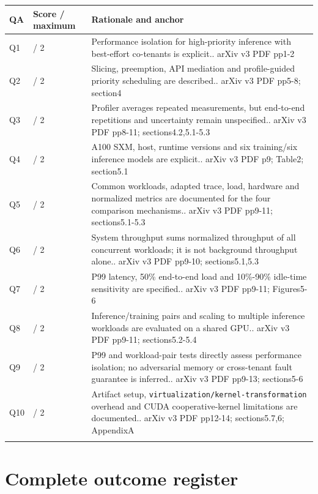\begin{longtable}{>{\raggedright\arraybackslash}p{}>{\raggedright\arraybackslash}p{}>{\raggedright\arraybackslash}p{}}
\toprule
\textbf{QA} & \textbf{Score / maximum} & \textbf{Rationale and anchor}\\\midrule\endhead
Q1 & 2 / 2 & Performance isolation for high-priority inference with best-effort co-tenants is explicit.. arXiv v3 PDF pp1-2\\\addlinespace
Q2 & 2 / 2 & Slicing, preemption, API mediation and profile-guided priority scheduling are described.. arXiv v3 PDF pp5-8; section4\\\addlinespace
Q3 & 1 / 2 & Profiler averages repeated measurements, but end-to-end repetitions and uncertainty remain unspecified.. arXiv v3 PDF pp8-11; sections4.2,5.1-5.3\\\addlinespace
Q4 & 2 / 2 & A100 SXM, host, runtime versions and six training/six inference models are explicit.. arXiv v3 PDF p9; Table2; section5.1\\\addlinespace
Q5 & 2 / 2 & Common workloads, adapted trace, load, hardware and normalized metrics are documented for the four comparison mechanisms.. arXiv v3 PDF pp9-11; sections5.1-5.3\\\addlinespace
Q6 & 2 / 2 & System throughput sums normalized throughput of all concurrent workloads; it is not background throughput alone.. arXiv v3 PDF pp9-10; sections5.1,5.3\\\addlinespace
Q7 & 2 / 2 & P99 latency, 50\% end-to-end load and 10\%-90\% idle-time sensitivity are specified.. arXiv v3 PDF pp9-11; Figures5-6\\\addlinespace
Q8 & 2 / 2 & Inference/training pairs and scaling to multiple inference workloads are evaluated on a shared GPU.. arXiv v3 PDF pp9-11; sections5.2-5.4\\\addlinespace
Q9 & 2 / 2 & P99 and workload-pair tests directly assess performance isolation; no adversarial memory or cross-tenant fault guarantee is inferred.. arXiv v3 PDF pp9-13; sections5-6\\\addlinespace
Q10 & 2 / 2 & Artifact setup, \nolinkurl{virtualization/kernel-transformation} overhead and CUDA cooperative-kernel limitations are documented.. arXiv v3 PDF pp12-14; sections5.7,6; AppendixA\\\addlinespace
\bottomrule\end{longtable}

\clearpage\section{Complete outcome register}\label{app:evidence}


